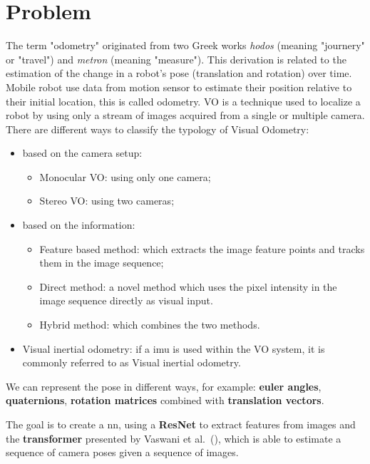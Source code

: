 \section{Problem}\label{sec:problem}
The term "odometry" originated from two Greek works \emph{hodos} (meaning "journery" or "travel") and \emph{metron} (meaning "measure").
This derivation is related to the estimation of the change in a robot's pose (translation and rotation) over time.
Mobile robot use data from motion sensor to estimate their position relative to their initial location, this is called odometry.
VO is a technique used to localize a robot by using only a stream of images acquired from a single or multiple camera.
There are different ways to classify the typology of Visual Odometry:
\begin{itemize}
    \item based on the camera setup:
        \begin{itemize}
            \item Monocular VO: using only one camera;
            \item Stereo VO: using two cameras;
        \end{itemize}
    \item based on the information:
        \begin{itemize}
            \item Feature based method: which extracts the image feature points and tracks them in the image sequence;
            \item Direct method: a novel method which uses the pixel intensity in the image sequence directly as visual input.
            \item Hybrid method: which combines the two methods.
        \end{itemize}
    \item Visual inertial odometry: if a \gls{imu} is used within the VO system, it is commonly referred to as Visual inertial odometry.
\end{itemize}
We can represent the pose in different ways, for example: \textbf{euler angles}, \textbf{quaternions}, \textbf{rotation matrices} combined with \textbf{translation vectors}.

The goal is to create a \gls{nn}, using a \textbf{ResNet} to extract features from images and the \textbf{transformer} presented by Vaswani et al.~(\cite{transformer_paper}), which is able to estimate a sequence of camera poses given a sequence of images.